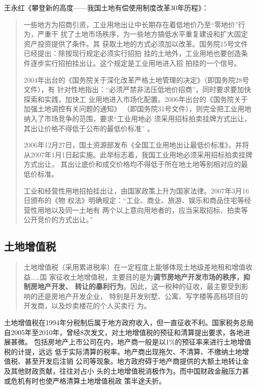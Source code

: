 王永红《攀登新的高度——我国土地有偿使用制度改革30年历程》：
\begin{quotation}
一些地方为招商引资，工业用地出让中长期存在着低地价乃至“零地价”行为，严重干
扰了土地市场秩序，为一些地方搞低水平重复建设和扩大固定资产投资提供了条件。其
获取土地的方式必须加以改革。国务院15号文件已经提出：除按现行规定必须实行招拍
挂的土地外，工业用地也要创造条件逐步实行招拍挂出让。这个规定是工业用地进入招
拍挂的一个信号。

2004年出台的《国务院关于深化改革严格土地管理的决定》（即国务院28号文件），有
针对性地指出：“必须严禁非法压低地价招商”，同时要求要加快探索和实践，加快工
业用地进入市场化配置。2006年出台的《国务院关于加强土地调控有关问题的通知》
（即国务院31号文件），则完全把工业用地纳入了市场竞争的范围，要求“工业用地必
须采用招标拍卖挂牌方式出让，其出让价格不得低于公布的最低价标准” 。

2006年12月27日，国土资源部发布《全国工业用地出让最低价标准》，并将
从2007年1月1日起实施。此举标志着，我国工业用地必须采用招标拍卖挂牌方式出让，
其出让底价和成交价格均不得低于所在地土地等别相对应的最低价标准。

工业和经营性用地招拍挂出让，由国家政策上升为国家法律。2007年3月16日颁布的《物
权法》明确规定：“工业、商业、旅游、娱乐和商品住宅等经营性用地以及同一土地有
两个以上意向用地者的，应当采取招标、拍卖等公开竞价的方式出让。”
\end{quotation}

\subsection{土地增值税}

\begin{quotation}
  土地增值税（采用累进税率）在一定程度上能够体现土地级差地租和增值收益……国
  家征收土地增值税，主要目的是为\textbf{调节房地产开发市场的秩序，抑制房地产开发、
    转让的暴利行为}。因此，这一税种的征收，最主要受到影响的还是房地产开发企业，
  特别是开发别墅、公寓、写字楼等高档项目的开发商，以及炒卖楼花的个人买卖行
  为。\cite{yangdi}
\end{quotation}

土地增值税在1994年分税制后属于地方政府收入，但一直征收不利。国家税务总局
自2005年至2010年，曾经8次发文，对土地增值税的预征和清算提出要求，各地进展甚微。
包括房地产上市公司在内，地产商一般是以1\%的预征率来进行土地增值税的计提，远远
低于实际清算的税率。地产商出现拖欠、不清算、不缴纳土地增值税、甚至开发后注销
公司等现象。地方政府碍于地产商提供的大额土地转让金及其他财政贡献，往往对占小
头的土地增值税消极作为。而中国财政金融压力甚或危机有时也使严格清算土地增值税政
策半途夭折。

